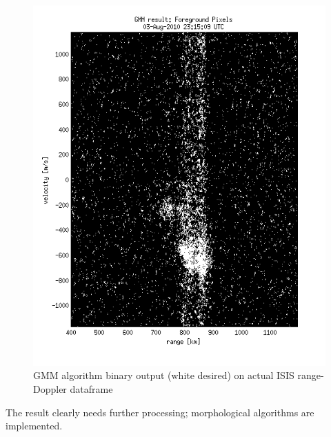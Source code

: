 \begin{figure}\centering
    \includegraphics[width=\linewidth]{gfx/gmmout}
    \caption{GMM algorithm binary output (white desired) on actual ISIS range-Doppler dataframe}\label{fig:gmmout}
\end{figure}
The result clearly needs further processing; morphological algorithms are implemented.

